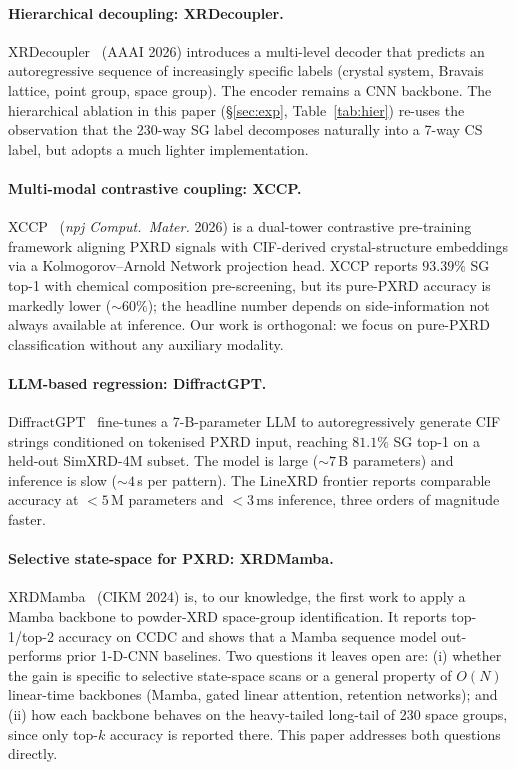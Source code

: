 \documentclass[final]{ws-ijwmip}
\begin{document}
\paragraph{Hierarchical decoupling: XRDecoupler.}
XRDecoupler~\cite{anonymous2026xrdecoupler} (AAAI 2026) introduces a
multi-level decoder that predicts an autoregressive sequence of
increasingly specific labels (crystal system, Bravais lattice, point
group, space group). The encoder remains a CNN backbone. The hierarchical
ablation in this paper (\S\ref{sec:exp}, Table~\ref{tab:hier}) re-uses
the observation that the 230-way SG label decomposes naturally into a
7-way CS label, but adopts a much lighter implementation.

\paragraph{Multi-modal contrastive coupling: XCCP.}
XCCP~\cite{anonymous2026xccp} (\emph{npj Comput.\ Mater.} 2026) is a
dual-tower contrastive pre-training framework aligning PXRD signals
with CIF-derived crystal-structure embeddings via a Kolmogorov--Arnold
Network projection head. XCCP reports $93.39\%$ SG top-1 with chemical
composition pre-screening, but its pure-PXRD accuracy is markedly lower
($\sim 60\%$); the headline number depends on side-information not
always available at inference. Our work is orthogonal: we focus on
pure-PXRD classification without any auxiliary modality.

\paragraph{LLM-based regression: DiffractGPT.}
DiffractGPT~\cite{anonymous2025diffractgpt} fine-tunes a 7-B-parameter
LLM to autoregressively generate CIF strings conditioned on tokenised
PXRD input, reaching $81.1\%$ SG top-1 on a held-out SimXRD-4M subset.
The model is large ($\sim 7$\,B parameters) and inference is slow
($\sim 4\,$s per pattern). The LineXRD frontier reports comparable
accuracy at $<5\,$M parameters and $<3\,$ms inference, three orders of
magnitude faster.

\paragraph{Selective state-space for PXRD: XRDMamba.}
XRDMamba~\cite{yu2024xrdmamba} (CIKM 2024) is, to our knowledge, the
first work to apply a Mamba backbone to powder-XRD space-group
identification. It reports top-1/top-2 accuracy on CCDC and shows
that a Mamba sequence model out-performs prior 1-D-CNN baselines.
Two questions it leaves open are: (i) whether the gain is specific
to selective state-space scans or a general property of $O(N)$
linear-time backbones (Mamba, gated linear attention, retention
networks); and (ii) how each backbone behaves on the heavy-tailed
long-tail of 230 space groups, since only top-$k$ accuracy is
reported there. This paper addresses both questions directly.
\end{document}
